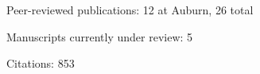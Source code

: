 \begin{veryTightItemize}
    \item Peer-reviewed publications: 12 at Auburn, 26 total
    \item Manuscripts currently under review: 5
    \item Citations: 853
\end{veryTightItemize}
